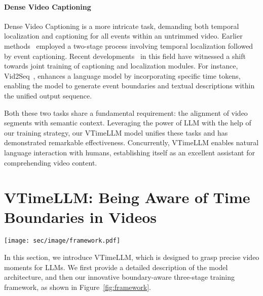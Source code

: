 \documentclass[10pt,twocolumn,letterpaper]{article}
\begin{document}
\paragraph{Dense Video Captioning} Dense Video Captioning is a more intricate task, demanding both temporal localization and captioning for all events within an untrimmed video. Earlier methods~\cite{duan2018weakly, iashin2020better_dense36, krishna2017dense_dense45} employed a two-stage process involving temporal localization followed by event captioning. Recent developments~\cite{wang2018bidirectional_dense96, zhou2018end_dense127, yang2023vid2seq} in this field have witnessed a shift towards joint training of captioning and localization modules. For instance, Vid2Seq~\cite{yang2023vid2seq}, enhances a language model by incorporating specific time tokens, enabling the model to generate event boundaries and textual descriptions within the unified output sequence.

Both these two tasks share a fundamental requirement: the alignment of video segments with semantic context. Leveraging the power of LLM with the help of our training strategy, our VTimeLLM model unifies these tasks and has demonstrated remarkable effectiveness. Concurrently, VTimeLLM enables natural language interaction with humans, establishing itself as an excellent assistant for comprehending video content. \section{VTimeLLM: Being Aware of Time Boundaries in Videos}

\begin{figure*}[!htbp]
  \centering
  \texttt{[image: sec/image/framework.pdf]}
  \caption{Our boundary-aware three-stage training framework. In the first stage, visual features are aligned with LLM's semantic space through image-text training. In the second stage, we transform a large-scale multi-event dataset into a QA format based on templates, training VTimeLLM to possess temporal boundary awareness and understand events within the boundaries. In the third stage, we create a high-quality dialogue dataset for instruction tuning, which aligns VTimeLLM with human intent and also enables more precise video temporal understanding.}
  \label{fig:framework}
\end{figure*}



In this section, we introduce VTimeLLM,  which is designed to grasp precise video moments for LLMs. We first provide a detailed description of the model architecture, and then our innovative boundary-aware three-stage training framework, as shown in Figure~\ref{fig:framework}.
\end{document}
